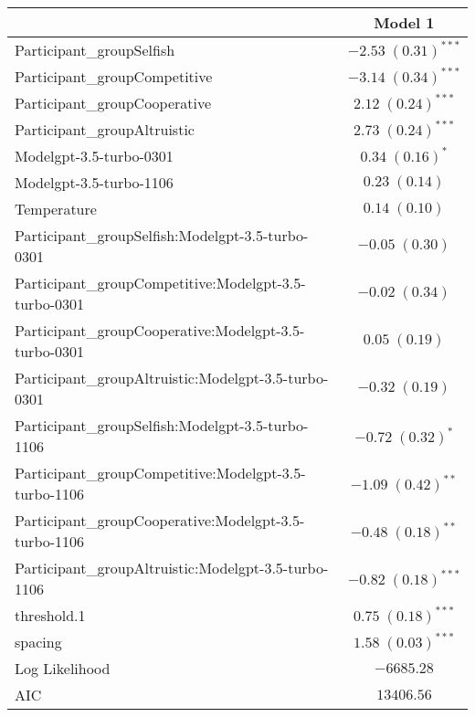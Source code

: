 
\begin{table}
\begin{center}
\begin{small}
\begin{tabular}{l c}
\hline
 & Model 1 \\
\hline
Participant\_groupSelfish                             & $-2.53 \; (0.31)^{***}$ \\
Participant\_groupCompetitive                         & $-3.14 \; (0.34)^{***}$ \\
Participant\_groupCooperative                         & $2.12 \; (0.24)^{***}$  \\
Participant\_groupAltruistic                          & $2.73 \; (0.24)^{***}$  \\
Modelgpt-3.5-turbo-0301                               & $0.34 \; (0.16)^{*}$    \\
Modelgpt-3.5-turbo-1106                               & $0.23 \; (0.14)$        \\
Temperature                                           & $0.14 \; (0.10)$        \\
Participant\_groupSelfish:Modelgpt-3.5-turbo-0301     & $-0.05 \; (0.30)$       \\
Participant\_groupCompetitive:Modelgpt-3.5-turbo-0301 & $-0.02 \; (0.34)$       \\
Participant\_groupCooperative:Modelgpt-3.5-turbo-0301 & $0.05 \; (0.19)$        \\
Participant\_groupAltruistic:Modelgpt-3.5-turbo-0301  & $-0.32 \; (0.19)$       \\
Participant\_groupSelfish:Modelgpt-3.5-turbo-1106     & $-0.72 \; (0.32)^{*}$   \\
Participant\_groupCompetitive:Modelgpt-3.5-turbo-1106 & $-1.09 \; (0.42)^{**}$  \\
Participant\_groupCooperative:Modelgpt-3.5-turbo-1106 & $-0.48 \; (0.18)^{**}$  \\
Participant\_groupAltruistic:Modelgpt-3.5-turbo-1106  & $-0.82 \; (0.18)^{***}$ \\
threshold.1                                           & $0.75 \; (0.18)^{***}$  \\
spacing                                               & $1.58 \; (0.03)^{***}$  \\
\hline
Log Likelihood                                        & $-6685.28$              \\
AIC                                                   & $13406.56$              \\

\end{tabular}
\end{small}
\end{center}
\end{table}
